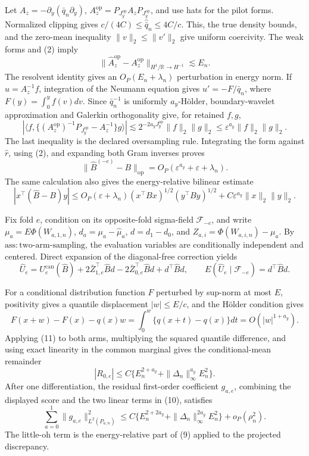 Let \(A_z=-\partial_y(\bar q_n\partial_y)\), \(A_z^{\mathrm{op}}=P_{J_y^{\mathrm{op}}}A_zP_{J_y^{\mathrm{op}}}\), and use hats for the pilot forms. Normalized clipping gives \(c/(4C)\le\widehat{\bar q}_n\le4C/c\). This, the true density bounds, and the zero-mean inequality \(\|v\|_2\le\|v'\|_2\) give uniform coercivity. The weak forms and (2) imply
\[
\|\widehat A_z^{\mathrm{op}}-A_z^{\mathrm{op}}\|_{H^1/\mathbb R\to H^{-1}}
\lesssim E_n.                                                     \tag{6}
\]
The resolvent identity gives an \(O_P(E_n+\lambda_n)\) perturbation in energy norm. If \(u=A_z^{-1}f\), integration of the Neumann equation gives \(u'=-F/\bar q_n\), where \(F(y)=\int_0^yf(v)dv\). Since \(\bar q_n^{-1}\) is uniformly \(a_y\)-H\"older, boundary-wavelet approximation and Galerkin orthogonality give, for retained \(f,g\),
\[
|\langle f,\{(A_z^{\mathrm{op}})^{-1}P_{J_y^{\mathrm{op}}}-A_z^{-1}\}g\rangle|
\lesssim2^{-2a_yJ_y^{\mathrm{op}}}\|f\|_2\|g\|_2
\le\varepsilon^{a_y}\|f\|_2\|g\|_2.                           \tag{7}
\]
The last inequality is the declared oversampling rule. Integrating the form against \(\widehat r\), using (2), and expanding both Gram inverses proves
\[
\|\widehat B^{(-e)}-B\|_{\mathrm{op}}
=O_P(\varepsilon^{a_y}+\varepsilon+\lambda_n).                   \tag{8}
\]
The same calculation also gives the energy-relative bilinear estimate
\[
|x^\top(\widehat B-B)y|
\le O_P(\varepsilon+\lambda_n)(x^\top Bx)^{1/2}(y^\top By)^{1/2}
+C\varepsilon^{a_y}\|x\|_2\|y\|_2.                             \tag{9}
\]

Fix fold \(e\), condition on its opposite-fold sigma-field \(\mathscr F_{-e}\), and write \(\mu_a=E\Phi(W_{a,1,n})\), \(d_a=\mu_a-\widehat\mu_a\), \(d=d_1-d_0\), and \(Z_{a,i}=\Phi(W_{a,i,n})-\mu_a\). By \(\mathrm{ass{:}two\text{-}arm\text{-}sampling}\), the evaluation variables are conditionally independent and centered. Direct expansion of the diagonal-free correction yields
\[
\widehat U_e=U_e^{\mathrm{can}}(\widehat B)
+2\bar Z_{1,e}^\top\widehat Bd-2\bar Z_{0,e}^\top\widehat Bd+d^\top\widehat Bd,
\qquad
E(\widehat U_e\mid\mathscr F_{-e})=d^\top\widehat Bd.           \tag{10}
\]

For a conditional distribution function \(F\) perturbed by sup-norm at most \(E\), positivity gives a quantile displacement \(|w|\le E/c\), and the H\"older condition gives
\[
F(x+w)-F(x)-q(x)w
=\int_0^w\{q(x+t)-q(x)\}dt=O(|w|^{1+a_y}).                      \tag{11}
\]
Applying (11) to both arms, multiplying the squared quantile difference, and using exact linearity in the common marginal gives the conditional-mean remainder
\[
|R_{0,e}|\le C\{E_n^{2+a_y}+\|\Delta_n\|_\infty^{a_y}E_n^2\}. \tag{12}
\]
After one differentiation, the residual first-order coefficient \(g_{a,e}\), combining the displayed score and the two linear terms in (10), satisfies
\[
\sum_{a=0}^1\|g_{a,e}\|_{L^2(P_{a,n})}^2
\le C\{E_n^{2+2a_y}+\|\Delta_n\|_\infty^{2a_y}E_n^2\}+o_P(\rho_n^2). \tag{13}
\]
The little-oh term is the energy-relative part of (9) applied to the projected discrepancy.

